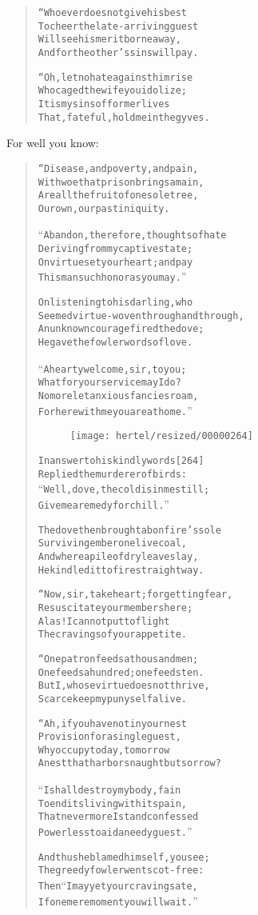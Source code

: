 \documentclass[article, twoside, 10pt]{memoir}
\renewenvironment{verbatim}{%
\begin{quote}%
\vskip -10pt%
\begin{alltt}\normalfont\small}{\end{alltt}%
\end{quote}%
\vskip -10pt
} %
\begin{document}
\begin{verbatim}
“Whoever does not give his best
To cheer the late-arriving guest
Will see his merit borne away,
And for the other's sins will pay.

“Oh, let no hate against him rise
Who caged the wife you idolize;
It is my sins of former lives
That, fateful, hold me in the gyves.
\end{verbatim}
For well you know:

\begin{verbatim}
“Disease, and poverty, and pain,
With woe that prison brings amain,
Are all the fruit of one sole tree,
Our own, our past iniquity.

“Abandon, therefore, thoughts of hate
Deriving from my captive state;
On virtue set your heart; and pay
This man such honor as you may.”

On listening to his darling, who
Seemed virtue-woven through and through,
An unknown courage fired the dove;
He gave the fowler words of love.

“A hearty welcome, sir, to you;
What for your service may I do?
No more let anxious fancies roam,
For here with me you are at home.”

\begin{figure}[p]\texttt{[image: hertel/resized/00000264]}\end{figure}In answer to his kindly words                           [264]
Replied the murderer of birds:
“Well, dove, the cold is in me still;
Give me a remedy for chill.”

The dove then brought a bonfire's sole
Surviving ember{\textemdash}one live coal,
And where a pile of dry leaves lay,
He kindled it to fire straightway.

“Now, sir, take heart; forgetting fear,
Resuscitate your members here;
Alas! I cannot put to flight
The cravings of your appetite.

“One patron feeds a thousand men;
One feeds a hundred; one feeds ten.
But I, whose virtue does not thrive,
Scarce keep my puny self alive.

“Ah, if you have not in your nest
Provision for a single guest,
Why occupy today, tomorrow
A nest that harbors naught but sorrow?

“I shall destroy my body, fain
To end its living with its pain,
That nevermore I stand confessed
Powerless to aid a needy guest.”

And thus he blamed himself, you see;
The greedy fowler went scot-free:
Then{\textemdash}“I may yet your craving sate,
If one mere moment you will wait.”


\end{verbatim}
\end{document}
